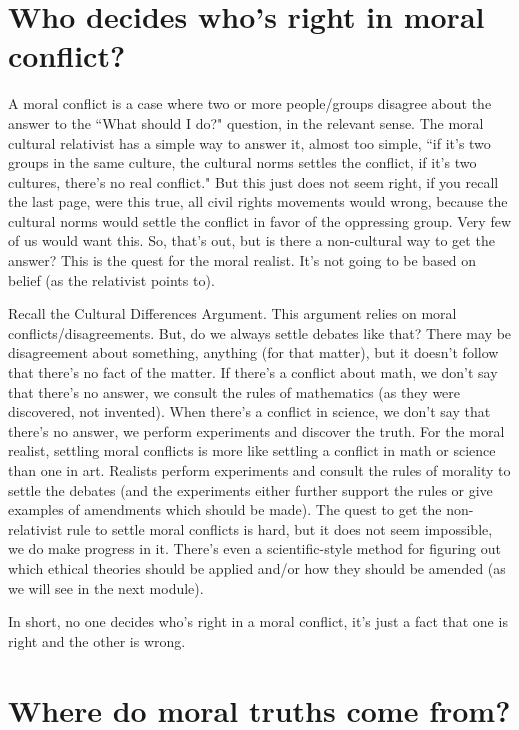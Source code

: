 \section{Who decides who's right in moral conflict?}

A moral conflict is a case where two or more people/groups disagree about the answer to the ``What should I do?" question, in the relevant sense. The moral cultural relativist has a simple way to answer it, almost too simple, ``if it's two groups in the same culture, the cultural norms settles the conflict, if it's two cultures, there's no real conflict." But this just does not seem right, if you recall the last page, were this true, all civil rights movements would wrong, because the cultural norms would settle the conflict in favor of the oppressing group. Very few of us would want this. So, that's out, but is there a non-cultural way to get the answer? This is the quest for the moral realist. It's not going to be based on belief (as the relativist points to).

Recall the Cultural Differences Argument. This argument relies on moral conflicts/disagreements. But, do we always settle debates like that? There may be disagreement about something, anything (for that matter), but it doesn't follow that there's no fact of the matter. If there's a conflict about math, we don't say that there's no answer, we consult the rules of mathematics (as they were discovered, not invented). When there's a conflict in science, we don't say that there's no answer, we perform experiments and discover the truth. For the moral realist, settling moral conflicts is more like settling a conflict in math or science than one in art. Realists perform experiments and consult the rules of morality to settle the debates (and the experiments either further support the rules or give examples of amendments which should be made). The quest to get the non-relativist rule to settle moral conflicts is hard, but it does not seem impossible, we do make progress in it. There's even a scientific-style method for figuring out which ethical theories should be applied and/or how they should be amended (as we will see in the next module).

In short, no one decides who's right in a moral conflict, it's just a fact that one is right and the other is wrong.

\section{Where do moral truths come from?}

